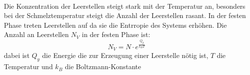 \documentclass[11pt,a4paper]{article}
\numberwithin{equation}{section}
\numberwithin{figure}{section}
\begin{document}
\\
\begin{addmargin}[25pt]{0pt}    
Die Konzentration der Leerstellen steigt stark mit der Temperatur an, besonders bei der Schmelztemperatur steigt die Anzahl der Leerstellen rasant. In der festen Phase treten Leerstellen auf da sie die Entrropie des Systems erhöhen. Die Anzahl an Leerstellen $N_V$ in der festen Phase ist: 
\begin{equation}\label{eq:Anzahl_Leerstellen}
    N_V = N\cdot e^{\frac{Q_y}{k_BT}}
\end{equation}
dabei ist $Q_y$ die Energie die zur Erzeugung einer Leerstelle nötig ist, $T$ die Temperatur und $k_B$ die Boltzmann-Konstante\\
\end{addmargin}
\end{document}
